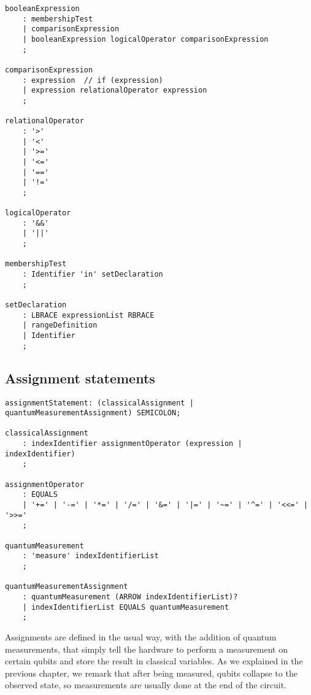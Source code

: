\documentclass[12pt,a4paper]{report}
\theoremstyle{definition}
\theoremstyle{definition}
\theoremstyle{definition}
\begin{document}
\begin{lstlisting}
booleanExpression
    : membershipTest
    | comparisonExpression
    | booleanExpression logicalOperator comparisonExpression
    ;

comparisonExpression
    : expression  // if (expression)
    | expression relationalOperator expression
    ;

relationalOperator
    : '>'
    | '<'
    | '>='
    | '<='
    | '=='
    | '!='
    ;

logicalOperator
    : '&&'
    | '||'
    ;

membershipTest
    : Identifier 'in' setDeclaration
    ;

setDeclaration
    : LBRACE expressionList RBRACE
    | rangeDefinition
    | Identifier
    ;
\end{lstlisting}

\subsection{Assignment statements}
\begin{lstlisting}
assignmentStatement: (classicalAssignment | quantumMeasurementAssignment) SEMICOLON;

classicalAssignment
    : indexIdentifier assignmentOperator (expression | indexIdentifier)
    ;

assignmentOperator
    : EQUALS
    | '+=' | '-=' | '*=' | '/=' | '&=' | '|=' | '~=' | '^=' | '<<=' | '>>='
    ;

quantumMeasurement
    : 'measure' indexIdentifierList
    ;

quantumMeasurementAssignment
    : quantumMeasurement (ARROW indexIdentifierList)?
    | indexIdentifierList EQUALS quantumMeasurement
    ;
\end{lstlisting}
Assignments are defined in the usual way, with the addition of quantum measurements, that simply tell the hardware to perform a measurement on certain qubits and store the result in classical variables. As we explained in the previous chapter, we remark that after being measured, qubits collapse to the observed state, so measurements are usually done at the end of the circuit.\\
\end{document}
